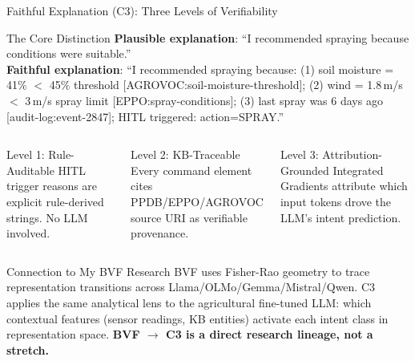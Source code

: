 \documentclass[aspectratio=169,10pt]{beamer}
\begin{document}
\begin{frame}{Faithful Explanation (C3): Three Levels of Verifiability}

\begin{block}{The Core Distinction}
\textbf{Plausible explanation}: ``I recommended spraying because conditions were suitable.'' \\
\textbf{Faithful explanation}: ``I recommended spraying because: (1) soil moisture = 41\% $<$ 45\% threshold
[AGROVOC:soil-moisture-threshold]; (2) wind = 1.8\,m/s $<$ 3\,m/s spray limit [EPPO:spray-conditions];
(3) last spray was 6 days ago [audit-log:event-2847]; HITL triggered: action=SPRAY.''
\end{block}

\begin{columns}[T]
\begin{exampleblock}{Level 1: Rule-Auditable}
\small
HITL trigger reasons are explicit rule-derived strings. No LLM involved.
\end{exampleblock}

\begin{exampleblock}{Level 2: KB-Traceable}
\small
Every command element cites PPDB/EPPO/AGROVOC source URI as verifiable provenance.
\end{exampleblock}

\begin{exampleblock}{Level 3: Attribution-Grounded}
\small
Integrated Gradients attribute which input tokens drove the LLM's intent prediction.
\end{exampleblock}
\end{columns}

\medskip
\begin{alertblock}{Connection to My BVF Research}
\small
BVF uses Fisher-Rao geometry to trace representation transitions across Llama/OLMo/Gemma/Mistral/Qwen.
C3 applies the same analytical lens to the agricultural fine-tuned LLM: which contextual features
(sensor readings, KB entities) activate each intent class in representation space.
\textbf{BVF $\to$ C3 is a direct research lineage, not a stretch.}
\end{alertblock}

\end{frame}
\end{document}
